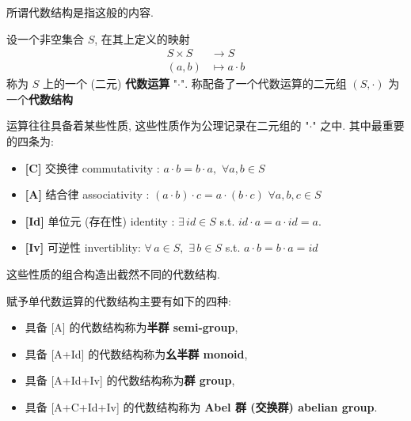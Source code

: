 \documentclass[UTF8]{book}
\begin{document}
所谓代数结构是指这般的内容. 
\begin{definition}
    设一个非空集合 $S$, 在其上定义的映射
    $$
    \begin{aligned}
    S \times S & \to S \\
    (a,b) & \mapsto a \cdot b 
    \end{aligned}
    $$
    称为 $S$ 上的一个 (二元) \textbf{代数运算} "$\cdot$". 
    称配备了一个代数运算的二元组 $ (S,\cdot) $ 为一个\textbf{代数结构}

    运算往往具备着某些性质, 这些性质作为公理记录在二元组的 "$\cdot$" 
    之中. 其中最重要的四条为: 
    \begin{itemize}
        \item \textbf{[C]} 交换律 commutativity : 
        $a \cdot b = b \cdot a,\,\,\forall a,b \in S$
        \item \textbf{[A]} 结合律 associativity : 
        $(a \cdot b)\cdot c =a \cdot(b \cdot c)\,\,\forall a,b,c \in S$
        \item \textbf{[Id]} 单位元 (存在性) identity : 
        $  \exists\, id \in S $ s.t. $id \cdot a = a \cdot id = a$.
        \item \textbf{[Iv]} 可逆性 invertiblity: 
        $ \forall\, a \in S,\,\,\exists \, b\in S $ s.t. 
        $ a \cdot b = b \cdot a = id $
    \end{itemize}
    这些性质的组合构造出截然不同的代数结构. 

    赋予单代数运算的代数结构主要有如下的四种: 
    \begin{itemize}
        \item 具备 [A] 的代数结构称为\textbf{半群 semi-group}, 
        \item 具备 [A+Id] 的代数结构称为\textbf{幺半群 monoid}, 
        \item 具备 [A+Id+Iv] 的代数结构称为\textbf{群 group}, 
        \item 具备 [A+C+Id+Iv] 的代数结构称为\textbf{ Abel 群 (交换群) abelian group}.
    \end{itemize}
\end{definition}
\end{document}
